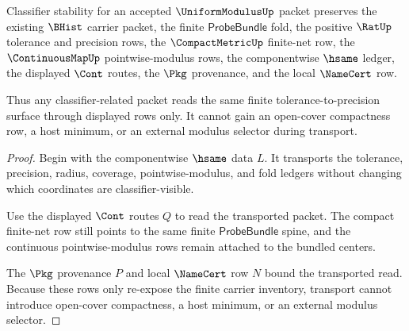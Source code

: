 \begin{theorem}
\label{thm:uniformmodulus-classifier-stability-obligation}
Classifier stability for an accepted $\UniformModulusUp$ packet preserves the existing $\BHist$ carrier packet, the finite $\mathsf{ProbeBundle}$ fold, the positive $\RatUp$ tolerance and precision rows, the $\CompactMetricUp$ finite-net row, the $\ContinuousMapUp$ pointwise-modulus rows, the componentwise $\hsame$ ledger, the displayed $\Cont$ routes, the $\Pkg$ provenance, and the local $\NameCert$ row.

Thus any classifier-related packet reads the same finite tolerance-to-precision surface through displayed rows only. It cannot gain an open-cover compactness row, a host minimum, or an external modulus selector during transport.
\end{theorem}
\begin{proof}
Begin with the componentwise $\hsame$ data $L$. It transports the tolerance, precision, radius, coverage, pointwise-modulus, and fold ledgers without changing which coordinates are classifier-visible.

Use the displayed $\Cont$ routes $Q$ to read the transported packet. The compact finite-net row still points to the same finite $\mathsf{ProbeBundle}$ spine, and the continuous pointwise-modulus rows remain attached to the bundled centers.

The $\Pkg$ provenance $P$ and local $\NameCert$ row $N$ bound the transported read. Because these rows only re-expose the finite carrier inventory, transport cannot introduce open-cover compactness, a host minimum, or an external modulus selector.
\end{proof}

